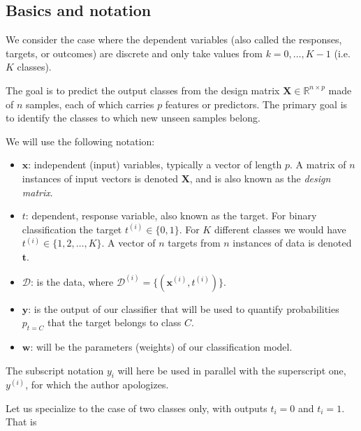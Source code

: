 \documentclass[%
oneside,                 %
final,                   %
10pt]{article}
\newenvironment{notice_mdfboxadmon}[1][]{
\begin{notice_mdfboxmdframed}[frametitle=#1]
}
{
\end{notice_mdfboxmdframed}
}
\begin{document}
\subsection{Basics and notation}

We consider the case where the dependent variables (also called the
responses, targets, or outcomes) are discrete and only take values
from $k=0,\dots,K-1$ (i.e.~$K$ classes).

The goal is to predict the
output classes from the design matrix $\boldsymbol{X}\in\mathbb{R}^{n\times p}$
made of $n$ samples, each of which carries $p$ features or predictors. The
primary goal is to identify the classes to which new unseen samples
belong.


\begin{notice_mdfboxadmon}[Notice]
We will use the following notation:
\begin{itemize}
\item $\boldsymbol{x}$: independent (input) variables, typically a vector of length $p$. A matrix of $n$ instances of input vectors is denoted $\boldsymbol{X}$, and is also known as the \emph{design matrix}.

\item $t$: dependent, response variable, also known as the target. For binary classification the target $t^{(i)} \in \{0,1\}$. For $K$ different classes we would have $t^{(i)} \in \{1, 2, \ldots, K\}$. A vector of $n$ targets from $n$ instances of data is denoted $\boldsymbol{t}$.

\item $\mathcal{D}$: is the data, where $\mathcal{D}^{(i)} = \{ (\boldsymbol{x}^{(i)}, t^{(i)} ) \}$.

\item $\boldsymbol{y}$: is the output of our classifier that will be used to quantify probabilities $p_{t=C}$ that the target belongs to class $C$.

\item $\boldsymbol{w}$: will be the parameters (weights) of our classification model.
\end{itemize}

\noindent
The subscript notation $y_i$ will here be used in parallel with the superscript one, $y^{(i)}$, for which the author apologizes.
\end{notice_mdfboxadmon} %



Let us specialize to the case of two classes only, with outputs
$t_i=0$ and $t_i=1$. That is
\end{document}
